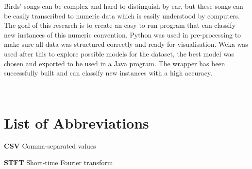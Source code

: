 Birds' songs can be complex and hard to distinguish by ear, but these songs can be easily transcribed to numeric data which is easily understood by computers.
The goal of this research is to create an easy to run program that can classify new instances of this numeric convention.
Python was used in pre-processing to make sure all data was structured correctly and ready for visualisation.
Weka was used after this to explore possible models for the dataset, the best model was chosen and exported to be used in a Java program.
The wrapper has been successfully built and can classify new instances with a high accuracy.

\label{sec:summ}~
\newpage

\section*{List of Abbreviations}

\textbf{CSV} Comma-separated values

\textbf{STFT} Short-time Fourier transform

\label{sec:abvs}~

\newpage